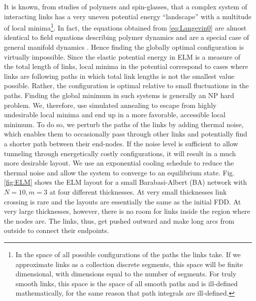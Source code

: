 \documentclass[nofootinbib,preprint,endfloats]{revtex4} %
\begin{document}
It is known, from studies of polymers and spin-glasses, that a complex system of interacting links has a very uneven potential energy ``landscape'' \cite{parisi2002physical} with a multitude of local minima\footnote{In the space of all possible configurations of the paths the links take.
If we approximate links as a collection discrete segments, this space will be finite dimensional, with dimensions equal to the number of segments. 
For truly smooth links, this space is the space of all smooth paths and is ill-defined mathematically, for the same reason that path integrals are ill-defined.}.
In fact, 
the equations obtained from \eqref{eq:Langevin0} are almost identical to field equations describing polymer dynamics and are a special case of general manifold dynamics \cite{mezard1991replica}. 
Hence finding the globally optimal configuration is virtually impossible. 
Since the elastic potential energy in ELM is a measure of the total length of links, local minima in the potential correspond to cases where links are following paths in which total link lengths is not the smallest value possible. 
Rather, the configuration is optimal relative to small fluctuations in the paths. 
Finding the global minimum in such systems is generally an NP hard problem.
We, therefore, use simulated annealing \cite{hwang1988simulated} to escape from highly undesirable local minima and end up in a more favorable, accessible local minimum. 
To do so, we perturb the paths of the links by adding thermal noise, which enables them to occasionally pass through other links and potentially find a shorter path between their end-nodes.
If the noise level is sufficient to allow tunneling through energetically costly configurations, it will result in a much more desirable layout.
We use an exponential cooling schedule to reduce the thermal noise and allow the system to converge to an equilibrium state. Fig. \ref{fig:ELM} shows the ELM layout for a small Barabasi-Albert (BA) network with $N=10, m=3$ at four different thicknesses. At very small thicknesses link crossing is rare and the layouts are essentially the same as the initial FDD. At very large thicknesses, however, there is no room for links inside the region where the nodes are. The links, thus, get pushed outward and make long arcs from outside to connect their endpoints.
\end{document}
